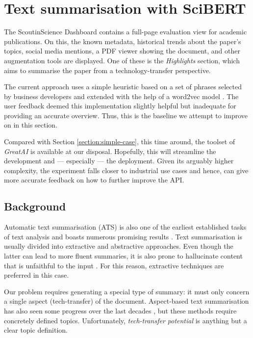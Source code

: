 \newpage
\section{Text summarisation with SciBERT} \label{section:complex-case}

The ScoutinScience Dashboard contains a full-page evaluation view for academic publications. On this, the known metadata, historical trends about the paper's topics, social media mentions, a PDF viewer showing the document, and other augmentation tools are displayed. One of these is the \textit{Highlights} section, which aims to summarise the paper from a technology-transfer perspective.

The current approach uses a simple heuristic based on a set of phrases selected by business developers and extended with the help of a word2vec model \cite{mikolov2013efficient}. The user feedback deemed this implementation slightly helpful but inadequate for providing an accurate overview. Thus, this is the baseline we attempt to improve on in this section.

\begin{displayquote}
Compared with Section \ref{section:simple-case}, this time around, the toolset of \textit{GreatAI} is available at our disposal. Hopefully, this will streamline the development and --- especially --- the deployment. Given its arguably higher complexity, the experiment falls closer to industrial use cases and hence, can give more accurate feedback on how to further improve the API.
\end{displayquote}

\subsection{Background}

Automatic text summarisation (ATS) is also one of the earliest established tasks of text analysis and boasts numerous promising results \cite{el2021automatic}. Text summarisation is usually divided into extractive and abstractive approaches. Even though the latter can lead to more fluent summaries, it is also prone to hallucinate content that is unfaithful to the input \cite{maynez2020faithfulness}. For this reason, extractive techniques are preferred in this case.

Our problem requires generating a special type of summary: it must only concern a single aspect (tech-transfer) of the document. Aspect-based text summarisation has also seen some progress over the last decades \cite{berkovsky2008aspect,hayashi2021wikiasp}, but these methods require concretely defined topics. Unfortunately, \textit{tech-transfer potential} is anything but a clear topic definition.

